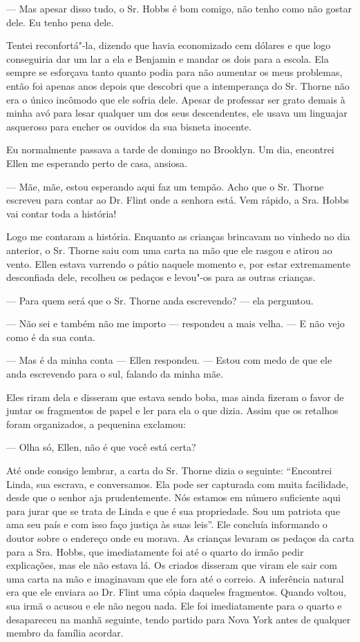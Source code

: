 --- Mas apesar disso tudo, o Sr. Hobbs é bom comigo, não tenho como não
gostar dele. Eu tenho pena dele.

Tentei reconfortá"-la, dizendo que havia economizado cem dólares e que
logo conseguiria dar um lar a ela e Benjamin e mandar os dois para a
escola. Ela sempre se esforçava tanto quanto podia para não aumentar os
meus problemas, então foi apenas anos depois que descobri que a
intemperança do Sr. Thorne não era o único incômodo que ele sofria dele.
Apesar de professar ser grato demais à minha avó para lesar qualquer um
dos seus descendentes, ele usava um linguajar asqueroso para encher os
ouvidos da sua bisneta inocente.

Eu normalmente passava a tarde de
domingo no Brooklyn. Um dia, encontrei Ellen me esperando perto de casa,
ansiosa.

--- Mãe, mãe, estou esperando aqui faz um tempão. Acho que o Sr. Thorne
escreveu para contar ao Dr. Flint onde a senhora está. Vem rápido, a
Sra. Hobbs vai contar toda a história!

Logo me contaram a história. Enquanto
as crianças brincavam no vinhedo no dia anterior, o Sr. Thorne saiu com
uma carta na mão que ele rasgou e atirou ao vento. Ellen estava varrendo
o pátio naquele momento e, por estar extremamente desconfiada dele,
recolheu os pedaços e levou"-os para as outras crianças.

--- Para quem será que o Sr. Thorne anda escrevendo? --- ela perguntou.

--- Não sei e também não me importo ---
respondeu a mais velha. --- E não vejo como é da sua conta.

--- Mas é da minha conta --- Ellen
respondeu. --- Estou com medo de que ele anda escrevendo para o sul,
falando da minha mãe.

Eles riram dela e disseram que estava
sendo boba, mas ainda fizeram o favor de juntar os fragmentos de papel e
ler para ela o que dizia. Assim que os retalhos foram organizados, a
pequenina exclamou:

--- Olha só, Ellen, não é que você está certa?

Até onde consigo lembrar, a carta do
Sr. Thorne dizia o seguinte: ``Encontrei Linda, sua escrava, e
conversamos. Ela pode ser capturada com muita facilidade, desde que o
senhor aja prudentemente. Nós estamos em número suficiente aqui para
jurar que se trata de Linda e que é sua propriedade. Sou um patriota que
ama seu país e com isso faço justiça às suas leis''. Ele concluía
informando o doutor sobre o endereço onde eu morava. As crianças levaram
os pedaços da carta para a Sra. Hobbs, que imediatamente foi até o
quarto do irmão pedir explicações, mas ele não estava lá. Os criados
disseram que viram ele sair com uma carta na mão e imaginavam que ele
fora até o correio. A inferência natural era que ele enviara ao Dr.
Flint uma cópia daqueles fragmentos. Quando voltou, sua irmã o acusou e
ele não negou nada. Ele foi imediatamente para o quarto e desapareceu na
manhã seguinte, tendo partido para Nova York antes de qualquer membro da
família acordar.

